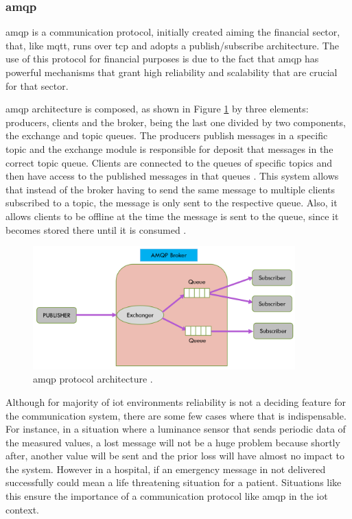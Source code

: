 \subsubsection{\acf{amqp}}

\acf{amqp} is a communication protocol, initially created aiming the financial sector, that, like \ac{mqtt}, runs over \ac{tcp} and adopts a publish/subscribe architecture. The use of this protocol for financial purposes is due to the fact that \ac{amqp} has powerful mechanisms that grant high reliability and scalability that are crucial for that sector.

\ac{amqp} architecture is composed, as shown in Figure \ref{fig:amqp} by three elements: producers, clients and the broker, being the last one divided by two components, the exchange and topic queues. The producers publish messages in a specific topic and the exchange module is responsible for deposit that messages in the correct topic queue. Clients are connected to the queues of specific topics and then have access to the published messages in that queues \cite{Salman2013}. This system allows that instead of the broker having to send the same message to multiple clients subscribed to a topic, the message is only sent to the respective queue. Also, it allows clients to be offline at the time the message is sent to the queue, since it becomes stored there until it is consumed \cite{Al-fuqaha2015}.

\begin{figure}[H]
	\centering
	\includegraphics[width=0.9\textwidth]{figures/amqp.png}
	\caption{\ac{amqp} protocol architecture \cite{Badugu}.}
	\label{fig:amqp}
\end{figure}

Although for majority of \ac{iot} environments reliability is not a deciding feature for the communication system, there are some few cases where that is indispensable. For instance, in a situation where a luminance sensor that sends periodic data of the measured values, a lost message will not be a huge problem because shortly after, another value will be sent and the prior loss will have almost no impact to the system. However in a hospital, if an emergency message in not delivered successfully could mean a life threatening situation for a patient. Situations like this ensure the importance of a communication protocol like \ac{amqp} in the \ac{iot} context.

